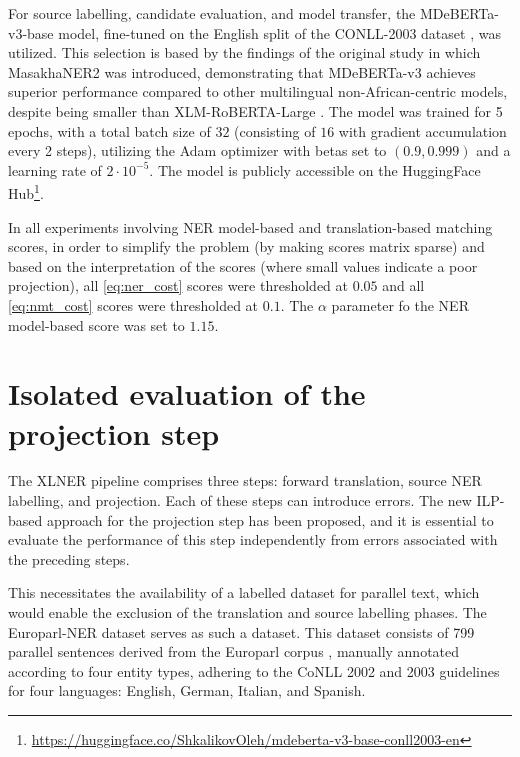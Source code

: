 For source labelling, candidate evaluation, and model transfer, the MDeBERTa-v3-base
model, fine-tuned on the English split of the CONLL-2003 dataset \cite{tjong-kim-sang-de-meulder-2003-introduction-conll},
was utilized. This selection is based by the findings of the original study in which
MasakhaNER2 was introduced, demonstrating that MDeBERTa-v3 achieves superior performance
compared to other multilingual non-African-centric models, despite being smaller than
XLM-RoBERTA-Large \cite{conneau-etal-2020-unsupervised-xlmr}. The model was trained
for 5 epochs, with a total batch size of \( 32 \) (consisting of \( 16 \) with gradient
accumulation every 2 steps), utilizing the Adam optimizer \cite{Kingma2014AdamAM} with
betas set to \( (0.9,0.999) \) and a learning rate of \( 2 \cdot 10^{-5} \). The model
is publicly accessible on the HuggingFace Hub\footnote{\url{https://huggingface.co/ShkalikovOleh/mdeberta-v3-base-conll2003-en}}.

In all experiments involving NER model-based and translation-based matching scores,
in order to simplify the problem (by making scores matrix sparse) and based on the interpretation of the scores
(where small values indicate a poor projection), all \eqref{eq:ner_cost} scores were
thresholded at \( 0.05 \) and all \eqref{eq:nmt_cost} scores were thresholded
at \( 0.1 \). The \( \alpha \) parameter fo the NER model-based score was set to \( 1.15 \).

\section{Isolated evaluation of the projection step}
The XLNER pipeline comprises three steps: forward translation, source NER labelling,
and projection. Each of these steps can introduce errors. The new ILP-based approach for the
projection step has been proposed, and it is essential to evaluate the performance
of this step independently from errors associated with the preceding steps.

This necessitates the availability of a labelled dataset for parallel text,
which would enable the exclusion of the translation and source labelling phases.
The Europarl-NER dataset \cite{agerri-etal-2018-building} serves as such a dataset.
This dataset consists of 799 parallel sentences derived from the Europarl corpus \cite{koehn2005europarl}, manually annotated according to four entity types, adhering to the CoNLL 2002 and 2003 guidelines for four languages: English, German, Italian, and Spanish.

